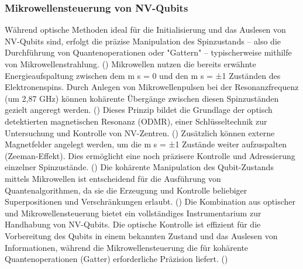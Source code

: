 \subsubsection{Mikrowellensteuerung von NV-Qubits}
Während optische Methoden ideal für die Initialisierung und das Auslesen von NV-Qubits sind, erfolgt die präzise Manipulation des Spinzustands – also die Durchführung von Quantenoperationen oder "Gattern" – typischerweise mithilfe von Mikrowellenstrahlung. (\cite{StickstoffFehlstellenZentrum2025}) Mikrowellen nutzen die bereits erwähnte Energieaufspaltung zwischen dem m s = 0 und den m s = ±1 Zuständen des Elektronenspins. Durch Anlegen von Mikrowellenpulsen bei der Resonanzfrequenz (um 2,87 GHz) können kohärente Übergänge zwischen diesen Spinzuständen gezielt angeregt werden. (\cite{StickstoffFehlstellenZentrum2025}) Dieses Prinzip bildet die Grundlage der optisch detektierten magnetischen Resonanz (ODMR), einer Schlüsseltechnik zur Untersuchung und Kontrolle von NV-Zentren. (\cite{StickstoffFehlstellenZentrum2025})
Zusätzlich können externe Magnetfelder angelegt werden, um die m s = ±1 Zustände weiter aufzuspalten (Zeeman-Effekt). Dies ermöglicht eine noch präzisere Kontrolle und Adressierung einzelner Spinzustände. (\cite{StickstoffFehlstellenZentrum2025}) Die kohärente Manipulation des Qubit-Zustands mittels Mikrowellen ist entscheidend für die Ausführung von Quantenalgorithmen, da sie die Erzeugung und Kontrolle beliebiger Superpositionen und Verschränkungen erlaubt. (\cite{verstAufbauMessplatzesZur})
Die Kombination aus optischer und Mikrowellensteuerung bietet ein vollständiges Instrumentarium zur Handhabung von NV-Qubits. Die optische Kontrolle ist effizient für die Vorbereitung des Qubits in einem bekannten Zustand und das Auslesen von Informationen, während die Mikrowellensteuerung die für kohärente Quantenoperationen (Gatter) erforderliche Präzision liefert. (\cite{verstAufbauMessplatzesZur})
